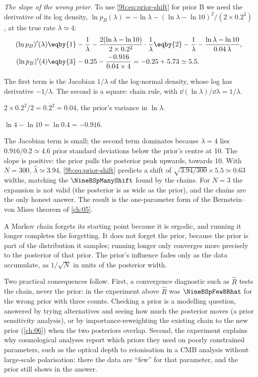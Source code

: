 \emph{The slope of the wrong prior.} To use \eqref{9b:eq:prior-shift} for prior B we need the
derivative of its log density, $\ln p_B(\lambda)=-\ln\lambda-(\ln\lambda-\ln10)^2/(2\times0.2^2)$,
at the true rate $\lambda\simeq4$:
\begin{align*}
  (\ln p_B)'(\lambda)
  &\eqby{1}-\frac1\lambda-\frac{2(\ln\lambda-\ln10)}{2\times0.2^2}\cdot\frac1\lambda
   \eqby{2}-\frac1\lambda-\frac{\ln\lambda-\ln10}{0.04\,\lambda},
  \\
  (\ln p_B)'(4)
  &\eqby{3}-0.25-\frac{-0.916}{0.04\times4}
   =-0.25+5.73\simeq5.5 .
\end{align*}
\begin{explain}
  \item The first term is the Jacobian $1/\lambda$ of the log-normal density, whose log has
        derivative $-1/\lambda$. The second is a square: chain rule, with
        $\dd(\ln\lambda)/\dd\lambda=1/\lambda$.
  \item $2\times0.2^2/2=0.2^2=0.04$, the prior's variance in $\ln\lambda$.
  \item $\ln4-\ln10=\ln0.4=-0.916$.
\end{explain}
The Jacobian term is small; the second term dominates because $\lambda=4$ lies $0.916/0.2\simeq4.6$
prior standard deviations below the prior's centre at 10. The slope is positive: the prior
pulls the posterior peak upwards, towards 10. With
$N=300$, $\hat\lambda\simeq3.94$, \eqref{9b:eq:prior-shift} predicts a shift of
$\sqrt{3.94/300}\times5.5\simeq0.63$ widths, matching the $\NineBSpManyShift$ found by the chains.
For $N=3$ the expansion is not valid (the posterior is as wide as the prior), and the chains are
the only honest answer. The result is the one-parameter form of the Bernstein--von Mises theorem
of \cref{ch:05}.

\begin{keyidea}
A Markov chain forgets its starting point because it is ergodic, and running it longer completes
the forgetting. It does not forget the prior, because the prior is part of the distribution it
samples; running longer only converges more precisely to the posterior of that prior. The prior's
influence fades only as the data accumulate, as $1/\sqrt N$ in units of the posterior width.
\end{keyidea}

Two practical consequences follow. First, a convergence diagnostic such as $\hat R$ tests the
chain, never the prior: in the experiment above $\hat R$ was $\NineBSpFewBRhat$ for the wrong
prior with three counts. Checking a prior is a modelling question, answered by trying
alternatives and seeing how much the posterior moves (a prior sensitivity analysis), or by
importance-reweighting the existing chain to the new prior (\cref{ch:06}) when the two posteriors
overlap. Second, the experiment explains why cosmological analyses report which priors they used
on poorly constrained parameters, such as the optical depth to reionisation in a CMB analysis
without large-scale polarisation: there the data are ``few'' for that parameter, and the prior
still shows in the answer.

